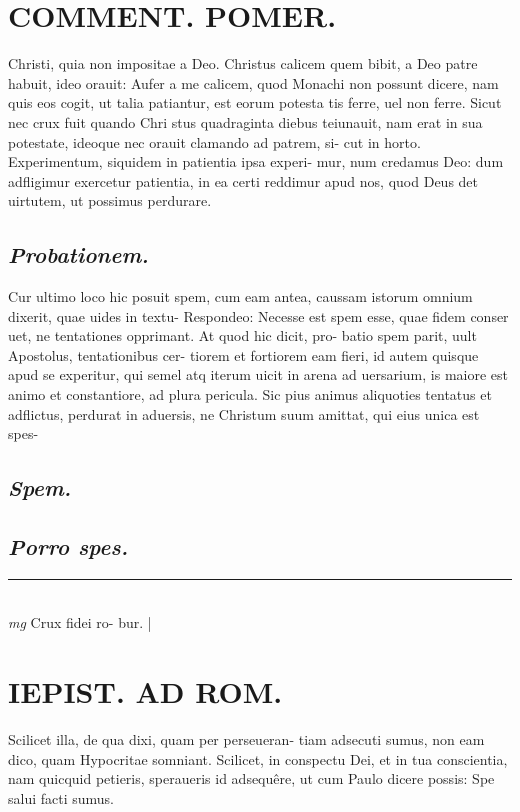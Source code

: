 \documentclass{article}
\begin{document}
\begin{pages}
\section*{COMMENT. POMER.  }\pstart Christi, quia non impositae a Deo. Christus calicem quem bibit, a Deo patre habuit, ideo orauit: Aufer a me calicem, quod Monachi non possunt dicere, nam quis eos cogit, ut talia patiantur, est eorum potesta tis ferre, uel non ferre. Sicut nec crux fuit quando Chri stus quadraginta diebus teiunauit, nam erat in sua potestate, ideoque nec orauit clamando ad patrem, si- cut in horto.  \pend\pstart Experimentum, siquidem in patientia ipsa experi- mur, num credamus Deo: dum adfligimur exercetur patientia, in ea certi reddimur apud nos, quod Deus det uirtutem, ut possimus perdurare.   \pend
{}
{}
\subsection*{\textit{Probationem. }}\pstart Cur ultimo loco hic posuit spem, cum eam antea, caussam istorum omnium dixerit, quae uides in textu- Respondeo: Necesse est spem esse, quae fidem conser uet, ne tentationes opprimant. At quod hic dicit, pro- batio spem parit, uult Apostolus, tentationibus cer- tiorem et fortiorem eam fieri, id autem quisque apud se experitur, qui semel atq iterum uicit in arena ad uersarium, is maiore est animo et constantiore, ad plura pericula. Sic pius animus aliquoties tentatus et adflictus, perdurat in aduersis, ne Christum suum amittat, qui eius unica est spes-  \pend
{}
{}
\subsection*{\textit{Spem. }}
{}
\subsection*{\textit{Porro spes. }}
\vspace{0.5cm}\noindent
\vspace{0.2cm}\rule{1cm}{0.2pt}\\ 
\hspace{0.2cm}\textit{mg}
\footnotesize Crux fidei ro- bur.  
\normalsize| 
\section*{IEPIST. AD ROM.  }
\marginpar{[ p.50 ]}\pstart Scilicet illa, de qua dixi, quam per perseueran- tiam adsecuti sumus, non eam dico, quam Hypocritae somniant.  \pend\pstart Scilicet, in conspectu Dei, et in tua conscientia, nam quicquid petieris, speraueris id adsequêre, ut cum Paulo dicere possis: Spe salui facti sumus.   \pend
{}
{}

\end{pages}
\end{document}
